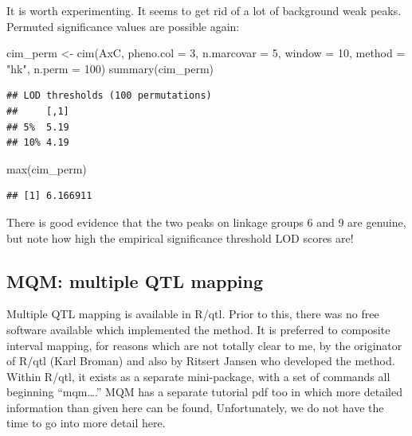 \documentclass[
]{book}
\newenvironment{Shaded}{\begin{snugshade}}{\end{snugshade}}
\newcommand{\AttributeTok}[1]{\textcolor[rgb]{0.77,0.63,0.00}{#1}}
\newcommand{\DecValTok}[1]{\textcolor[rgb]{0.00,0.00,0.81}{#1}}
\newcommand{\FunctionTok}[1]{\textcolor[rgb]{0.00,0.00,0.00}{#1}}
\newcommand{\NormalTok}[1]{#1}
\newcommand{\OtherTok}[1]{\textcolor[rgb]{0.56,0.35,0.01}{#1}}
\newcommand{\StringTok}[1]{\textcolor[rgb]{0.31,0.60,0.02}{#1}}
\begin{document}
It is worth experimenting. It seems to get rid of a lot of background weak peaks. Permuted significance values are possible again:

\begin{Shaded}
\begin{Highlighting}[]
\NormalTok{cim\_perm }\OtherTok{\textless{}{-}} \FunctionTok{cim}\NormalTok{(AxC, }\AttributeTok{pheno.col =} \DecValTok{3}\NormalTok{, }\AttributeTok{n.marcovar =} \DecValTok{5}\NormalTok{, }\AttributeTok{window =} \DecValTok{10}\NormalTok{, }
    \AttributeTok{method =} \StringTok{"hk"}\NormalTok{, }\AttributeTok{n.perm =} \DecValTok{100}\NormalTok{)}
\FunctionTok{summary}\NormalTok{(cim\_perm)}
\end{Highlighting}
\end{Shaded}

\begin{verbatim}
## LOD thresholds (100 permutations)
##     [,1]
## 5%  5.19
## 10% 4.19
\end{verbatim}

\begin{Shaded}
\begin{Highlighting}[]
\FunctionTok{max}\NormalTok{(cim\_perm)}
\end{Highlighting}
\end{Shaded}

\begin{verbatim}
## [1] 6.166911
\end{verbatim}

There is good evidence that the two peaks on linkage groups 6 and 9 are genuine, but note how high the empirical significance threshold LOD scores are!

\hypertarget{mqm-multiple-qtl-mapping}{%
\subsection{MQM: multiple QTL mapping}\label{mqm-multiple-qtl-mapping}}

Multiple QTL mapping is available in R/qtl. Prior to this, there was no free software available which implemented the method. It is preferred to composite interval mapping, for reasons which are not totally clear to me, by the originator of R/qtl (Karl Broman) and also by Ritsert Jansen who developed the method. Within R/qtl, it exists as a separate mini-package, with a set of commands all beginning ``mqm\ldots.'' MQM has a separate tutorial pdf too in which more detailed information than given here can be found, Unfortunately, we do not have the time to go into more detail here.
\end{document}
